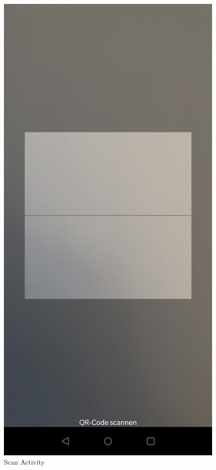 \documentclass[12pt,					%
							 oneside,			%
							 a4paper,			%
							 halfparskip,		%
							 liststotoc,			%
							 bibtotoc,			%
							 fleqn,				%
							 pointlessnumbers]	%
							 {scrreprt}
\begin{document}
\begin{figure}[ht]
\begin{minipage}[b]{.4\linewidth}
	 \includegraphics[scale=0.1]{pictures/scan} 
 	\caption{Scan Activity}
   \end{minipage}
   \hspace{.1\linewidth}%

\end{figure}
\end{document}

